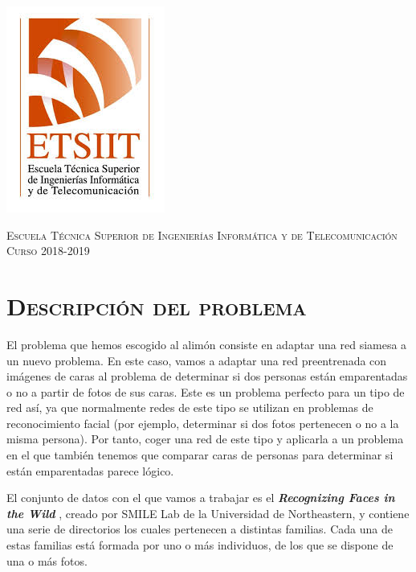 \documentclass[11pt,a4paper]{article}
\begin{document}
\begin{titlepage}
\begin{minipage}{\textwidth}
\includegraphics[scale=0.3]{img/etsiit.jpeg}

\vspace{0.7cm}
\textsc{Escuela Técnica Superior de Ingenierías Informática y de Telecomunicación}\\
\vspace{1cm}
\textsc{Curso 2018-2019}
\end{minipage}
\end{titlepage}

\tableofcontents
\thispagestyle{empty}				%


\newpage

\setlength{\parskip}{1em}

\section{\textsc{Descripción del problema}}

El problema que hemos escogido al alimón consiste en adaptar una red siamesa a un nuevo problema.
En este caso, vamos a adaptar una red preentrenada con imágenes de caras al problema de determinar
si dos personas están emparentadas o no a partir de fotos de sus caras. Este es un problema perfecto
para un tipo de red así, ya que normalmente redes de este tipo se utilizan en problemas de reconocimiento
facial (por ejemplo, determinar si dos fotos pertenecen o no a la misma persona). Por tanto, coger una red
de este tipo y aplicarla a un problema en el que también tenemos que comparar caras de personas
para determinar si están emparentadas parece lógico.

El conjunto de datos con el que vamos a trabajar es el \textbf{\textit{Recognizing Faces in the Wild}} \cite{faces},
creado por SMILE Lab de la Universidad de Northeastern, y contiene una serie de directorios los cuales
pertenecen a distintas familias. Cada una de estas familias está formada por uno o más individuos,
de los que se dispone de una o más fotos.
\end{document}
